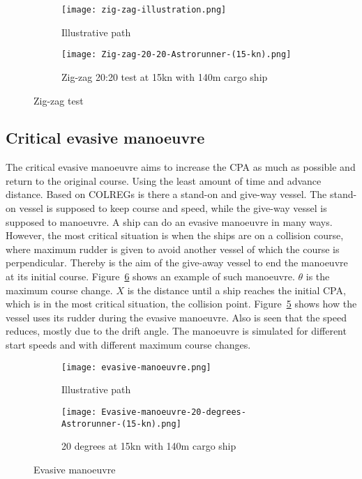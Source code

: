 \begin{figure}[p]
	\begin{subfigure}[b]{0.43\linewidth}
		\centering
		\texttt{[image: zig-zag-illustration.png]}
		\caption{Illustrative path}
		\label{fig:zig-zag-path}
	\end{subfigure} 
	\begin{subfigure}[b]{0.56\linewidth}
		\centering
		\texttt{[image: Zig-zag-20-20-Astrorunner-(15-kn).png]}
		\caption{Zig-zag 20:20 test at 15kn with 140m cargo ship}
		\label{fig:zig-zag-astrorunner}
	\end{subfigure}
	\caption{Zig-zag test}
	\label{fig:zig-zag} 
\end{figure}

\newpage

\subsection{Critical evasive manoeuvre}
\label{sec:evasive-manoeuvrer}
The critical evasive manoeuvre aims to increase the \acf{CPA} as much as possible and return to the original course. Using the least amount of time and advance distance. Based on \ac{COLREGs} is there a stand-on and give-way vessel. The stand-on vessel is supposed to keep course and speed, while the give-way vessel is supposed to manoeuvre. 
A ship can do an evasive manoeuvre in many ways. However, the most critical situation is when the ships are on a collision course, where maximum rudder is given to avoid another vessel of which the course is perpendicular. Thereby is the aim of the give-away vessel to end the manoeuvre at its initial course. Figure~\ref{fig:evasive-manoeuvrer} shows an example of such manoeuvre. $\theta$ is the maximum course change. $X$ is the distance until a ship reaches the initial CPA, which is in the most critical situation, the collision point. Figure~\ref{fig:astrorunner-evasive-20} shows how the vessel uses its rudder during the evasive manoeuvre. Also is seen that the speed reduces, mostly due to the drift angle. The manoeuvre is simulated for different start speeds and with different maximum course changes. 

\begin{figure}[hbp]
	\begin{subfigure}[b]{0.43\linewidth}
		\centering
		\texttt{[image: evasive-manoeuvre.png]}
		\caption{Illustrative path}
		\label{fig:evasive-manoeuvrer-path}
	\end{subfigure} 
	\begin{subfigure}[b]{0.56\linewidth}
		\centering
		\texttt{[image: Evasive-manoeuvre-20-degrees-Astrorunner-(15-kn).png]}
		\caption{20 degrees at 15kn with 140m cargo ship}
		\label{fig:astrorunner-evasive-20}
	\end{subfigure}
	\caption{Evasive manoeuvre}
	\label{fig:evasive-manoeuvrer} 
\end{figure}
\clearpage

